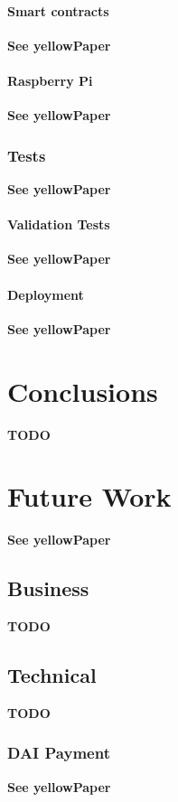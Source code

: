 \documentclass[12pt]{report}
\begin{document}
	\subsubsection{Smart contracts} \label{ch:smart-contracts}
  \textbf{See yellowPaper}


  \subsubsection{Raspberry Pi} \label{ch:raspberry}
  \textbf{See yellowPaper}

  \subsection{Tests} \label{ch:test}
	\textbf{See yellowPaper}

  \subsubsection{Validation Tests} \label{sec:validation-test}
  \textbf{See yellowPaper}

  \subsubsection{Deployment} \label{sec:deployment}
  \textbf{See yellowPaper}


  \chapter{Conclusions} \label{sec:conclusions}
  \textbf{TODO}

  \chapter{Future Work} \label{sec:future-work}
	\textbf{See yellowPaper}

	\section{Business} \label{ch:furute-business}
  \textbf{TODO}


	\section{Technical} \label{ch:future-technical}
  \textbf{TODO}

  \subsection{DAI Payment} \label{ch:dai-payment}
  \textbf{See yellowPaper}
\end{document}

